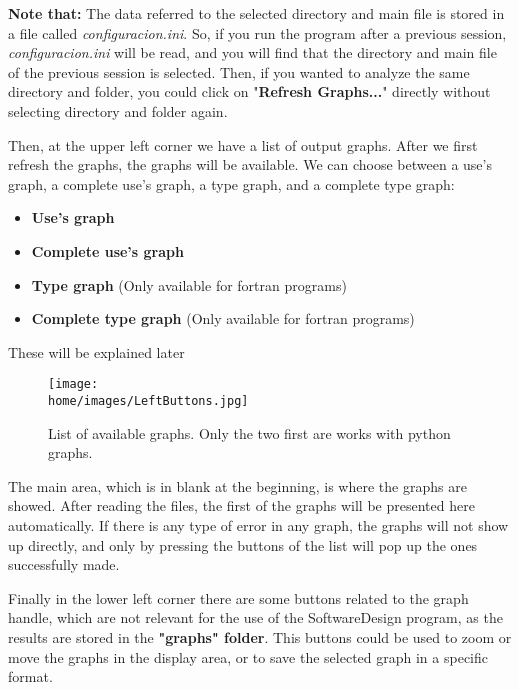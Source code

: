 \textbf{Note that:} The data referred to the selected directory and main file is stored in a file called \textit{configuracion.ini}. So, if you run the program after a previous session, \textit{configuracion.ini} will be read, and you will find that the directory and main file of the previous session is selected. Then, if you wanted to analyze the same directory and folder, you could click on "\textbf{Refresh Graphs...}" directly without selecting directory and folder again.

\newpage
Then, at the upper left corner we have a list of output graphs. After we first refresh the graphs, the graphs will be available. We can choose between a use's graph, a complete use's graph, a type graph, and a complete type graph:


\begin{itemize}
    \item \textbf{Use's graph}
    \item \textbf{Complete use's graph}
    \item \textbf{Type graph} (Only available for fortran programs)
    \item \textbf{Complete type graph} (Only available for fortran programs)
\end{itemize}

These will be explained later

\begin{figure}[H]
    \begin{center}
        \texttt{[image: \\home/images/LeftButtons.jpg]}
        \caption{List of available graphs. Only the two first are works with python graphs.}
    \end{center}
\end{figure}

The main area, which is in blank at the beginning, is where the graphs are showed. After reading the files, the first of the graphs will be presented here automatically. If there is any type of error in any graph, the graphs will not show up directly, and only by pressing the buttons of the list will pop up the ones successfully made.

Finally in the lower left corner there are some buttons related to the graph handle, which are not relevant for the use of the SoftwareDesign program, as the results are stored in the \textbf{"graphs" folder}. This buttons could be used to zoom or move the graphs in the display area, or to save the selected graph in a specific format.



